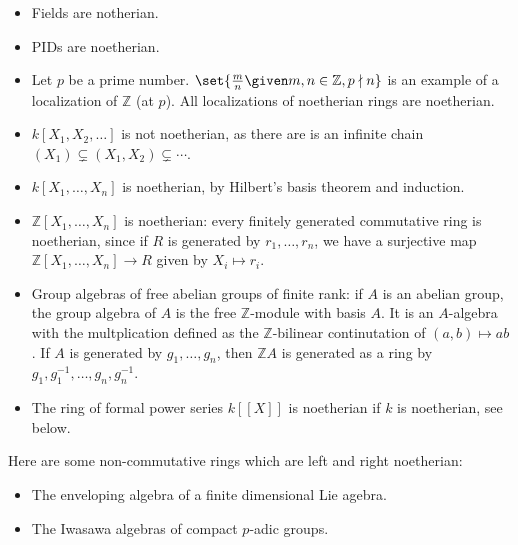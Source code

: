 \begin{itemize}
	\item Fields are notherian.
	\item PIDs are noetherian.
	\item Let $p$ be a prime number. $\set{\frac{m}{n}\given m, n \in \mathbb{Z}, p \nmid n}$ is an example
		of a localization of $\mathbb{Z}$ (at $p$). All localizations of noetherian rings are noetherian.
	\item $k[X_1, X_2, \ldots]$ is not noetherian, as there are is an infinite chain $(X_1) \subsetneq (X_1, X_2) \subsetneq \cdots$.
	\item $k[X_1, \ldots, X_n]$ is noetherian, by Hilbert's basis theorem and induction.
	\item $\mathbb{Z}[X_1, \ldots, X_n]$ is noetherian: every finitely generated commutative ring is noetherian,
		since if $R$ is generated by $r_1, \ldots, r_n$, we have a surjective map
		$\mathbb{Z}[X_1, \ldots, X_n]\to R$ given by $X_i\mapsto r_i$.
	\item Group algebras of free abelian groups of finite rank: if $A$ is an abelian group,
		the group algebra of $A$ is the free $\mathbb{Z}$-module with basis  $A$. It is
		an $A$-algebra with the multplication defined as the $\mathbb{Z}$-bilinear
		continutation of $(a, b)\mapsto ab$. If $A$ is generated by
		$g_1, \ldots, g_n$, then $\mathbb{Z}A$ is generated as a ring by
		$g_1, g_1^{-1}, \ldots, g_n, g_n^{-1}$.

	\item The ring of formal power series $k[[X]]$ is noetherian if $k$ is noetherian, see below.
\end{itemize}

Here are some non-commutative rings which are left and right noetherian:
\begin{itemize}
	\item The enveloping algebra of a finite dimensional Lie agebra.
	\item The Iwasawa algebras of compact $p$-adic groups.
\end{itemize}
